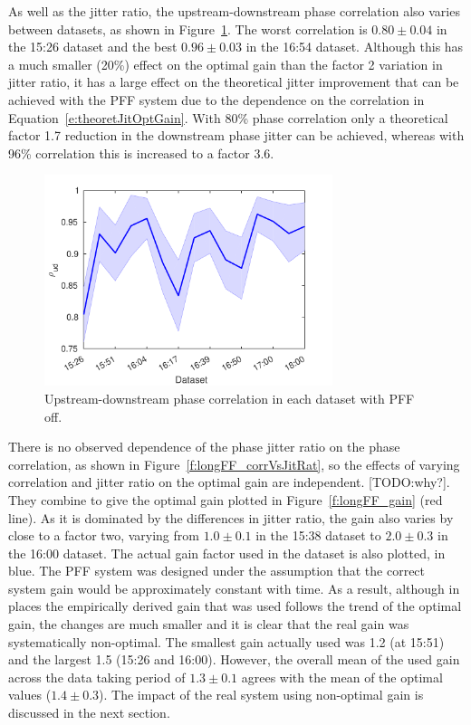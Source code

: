 As well as the jitter ratio, the upstream-downstream phase correlation also varies between datasets, as shown in Figure~\ref{f:longFF_corrFFOff}. The worst correlation is \(0.80\pm0.04\) in the 15:26 dataset and the best \(0.96\pm0.03\) in the 16:54 dataset. Although this has a much smaller (20\%) effect on the optimal gain than the factor 2 variation in jitter ratio, it has a large effect on the theoretical jitter improvement that can be achieved with the PFF system due to the dependence on the correlation in Equation~\ref{e:theoretJitOptGain}. With 80\% phase correlation only a theoretical factor 1.7 reduction in the downstream phase jitter can be achieved, whereas with 96\% correlation this is increased to a factor 3.6.

\begin{figure}
  \centering
  \includegraphics[width=0.75\textwidth]{Figures/feedforward/longFF_corrFFOff}
  \caption{Upstream-downstream phase correlation in each dataset with PFF off.}
  \label{f:longFF_corrFFOff}
\end{figure}

There is no observed dependence of the phase jitter ratio on the phase correlation, as shown in Figure~\ref{f:longFF_corrVsJitRat}, so the effects of varying correlation and jitter ratio on the optimal gain are independent. [TODO:why?]. They combine to give the optimal gain plotted in Figure~\ref{f:longFF_gain} (red line). As it is dominated by the differences in jitter ratio, the gain also varies by close to a factor two, varying from \(1.0\pm0.1\) in the 15:38 dataset to \(2.0\pm0.3\) in the 16:00 dataset. The actual gain factor used in the dataset is also plotted, in blue.
The PFF system was designed under the assumption that the correct system gain would be approximately constant with time.
As a result, although in places the empirically derived gain that was used follows the trend of the optimal gain, the changes are much smaller and it is clear that the real gain was systematically non-optimal. 
The smallest gain actually used was 1.2 (at 15:51) and the largest 1.5 (15:26 and 16:00). However, the overall mean of the used gain across the data taking period of \(1.3\pm0.1\) agrees with the mean of the optimal values (\(1.4\pm0.3\)). 
The impact of the real system using non-optimal gain is discussed in the next section.

